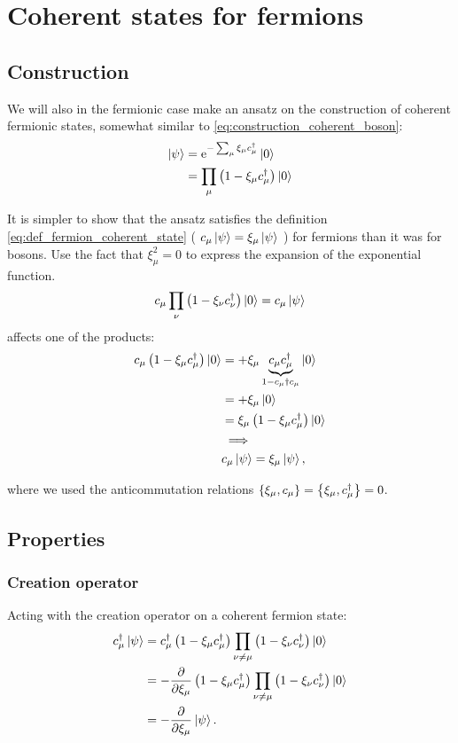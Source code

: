 \section{Coherent states for fermions}

\subsection{Construction}

We will also in the fermionic case make an ansatz on the construction of coherent fermionic states, somewhat similar to \eqref{eq:construction_coherent_boson}:
\begin{align}
\ket \psi &= \mathrm{e}^{-\sum_\mu\xi_\mu c_\mu^\dagger}\ket 0 \\
&= \prod_\mu \left(1-\xi_\mu c_\mu^\dagger\right)\ket 0
\end{align}

It is simpler to show that the ansatz satisfies the definition \eqref{eq:def_fermion_coherent_state} ( \( c_\mu \ket{\psi} = \xi_\mu\ket{\psi}\) ) for fermions than it was for bosons. Use the fact that \(\xi_\mu^2 = 0\) to express the expansion of the exponential function. 
\begin{equation}
c_\mu\prod_\nu\left(1-\xi_\nu c_\nu^\dagger\right)\ket 0 = c_\mu \ket \psi
\end{equation}
affects one of the products:
\begin{align}
c_\mu\left(1-\xi_\mu c_\mu^\dagger\right)\ket 0 &= +\xi_\mu \underbrace{c_\mu c_\mu^\dagger}_{1-c_\mu\dagger c_\mu}\ket 0 \\
&= +\xi_\mu \ket 0  \\
&= \xi_\mu\left(1-\xi_\mu c_\mu^\dagger\right)\ket 0 \\
&\implies \nonumber\\
 &c_\mu\ket \psi = \xi_\mu\ket\psi,
\end{align} 

where we used the anticommutation relations \(\acomm{\xi_\mu}{c_\mu} = \acomm{\xi_\mu}{c_\mu^\dagger} =0\).

\subsection{Properties}
\subsubsection{Creation operator}
Acting with the creation operator on a coherent fermion state:
\begin{align*}
c_\mu^\dagger\ket\psi &= c_\mu^\dagger\left(1-\xi_\mu c_\mu^\dagger\right)\prod_{\nu \ne \mu}\left(1-\xi_\nu c_\nu^\dagger\right)\ket 0\\
&= -\pdv{\xi_\mu}\left(1-\xi_\mu c_\mu^\dagger\right)\prod_{\nu \ne \mu}\left(1-\xi_\nu c_\nu^\dagger\right)\ket 0 \\
&= -\pdv{\xi_\mu}\ket \psi.
\end{align*}

